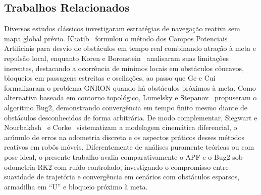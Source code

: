 \subsection{Trabalhos Relacionados}

Diversos estudos clássicos investigaram estratégias de navegação reativa sem mapa global prévio. Khatib~\cite{khatib1986} formulou o método dos Campos Potenciais Artificiais para desvio de obstáculos em tempo real combinando atração à meta e repulsão local, enquanto Koren e Borenstein~\cite{koren1991} analisaram suas limitações inerentes, destacando a ocorrência de mínimos locais em obstáculos côncavos, bloqueios em passagens estreitas e oscilações, ao passo que Ge e Cui~\cite{ge2000} formalizaram o problema GNRON quando há obstáculos próximos à meta. Como alternativa baseada em contorno topológico, Lumelsky e Stepanov~\cite{lumelsky1987} propuseram o algoritmo Bug2, demonstrando convergência em tempo finito mesmo diante de obstáculos desconhecidos de forma arbitrária. De modo complementar, Siegwart e Nourbakhsh~\cite{siegwart2004} e Corke~\cite{corke2023} sistematizam a modelagem cinemática diferencial, o acúmulo de erros na odometria discreta e os aspectos práticos desses métodos reativos em robôs móveis. Diferentemente de análises puramente teóricas ou com pose ideal, o presente trabalho avalia comparativamente o APF e o Bug2 sob odometria RK2 com ruído controlado, investigando o compromisso entre suavidade de trajetória e convergência em cenários com obstáculos esparsos, armadilha em ``U'' e bloqueio próximo à meta.
